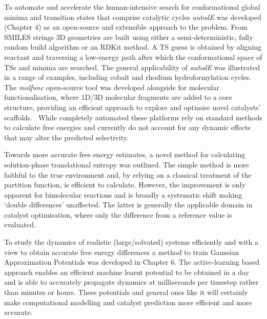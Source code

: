 \documentclass[../main.tex]{subfiles}
\begin{document}
To automate and accelerate the human-intensive search for conformational global minima and transition states that comprise catalytic cycles \emph{autodE} was developed (Chapter 4) as an open-source and extensible approach to the problem. From SMILES strings 3D geometries are built using either a semi-deterministic, fully random build algorithm or an RDKit\cite{Landrum2019} method. A TS guess is obtained by aligning reactant and traversing a low-energy path after which the conformational space of TSs and minima are searched. The general applicability of \emph{autodE} was illustrated in a range of examples, including cobalt and rhodium hydroformylation cycles. The \emph{molfunc} open-source tool was developed alongside for molecular functionalisation, where 1D/3D molecular fragments are added to a core structure, providing an efficient approach to explore and optimise novel catalysts’ scaffolds.  While completely automated these platforms rely on standard methods to calculate free energies and currently do not account for any dynamic effects that may alter the predicted selectivity.


Towards more accurate free energy estimates, a novel method for calculating solution-phase translational entropy was outlined. The simple method is more faithful to the true environment and, by relying on a classical treatment of the partition function, is efficient to calculate. However, the improvement is only apparent for bimolecular reactions and is broadly a systematic shift making `double differences' unaffected. The latter is generally the applicable domain in catalyst optimisation, where only the difference from a reference value is evaluated.


To study the dynamics of realistic (large/solvated) systems efficiently and with a view to obtain accurate free energy differences a method to train Gaussian Approximation Potentials was developed in Chapter 6. The active-learning based approach enables an efficient machine learnt potential to be obtained in a day and is able to accurately propagate dynamics at milliseconds per timestep rather than minutes or hours. These potentials and general ones like it will certainly make computational modelling and catalyst prediction more efficient and more accurate.
\end{document}
